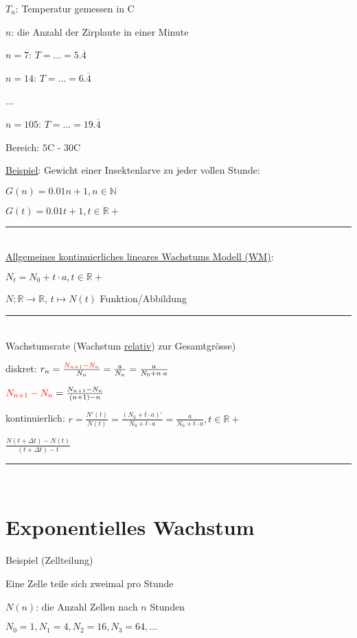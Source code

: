 \documentclass[18pt,a4paper]{scrreprt}
\begin{document}
$T_n$: Temperatur gemessen in \textdegree C

$n$: die Anzahl der Zirplaute in einer Minute

$n = 7$: $T = ... = 5.\overline{4}$ 

$n = 14$: $T = ... = 6.\overline{4}$

...

$n = 105$: $T = ... = 19.\overline{4}$

Bereich: $5$\textdegree C - $30$\textdegree C

\uline{Beispiel}: Gewicht einer Insektenlarve zu jeder vollen Stunde:

$G(n) = 0.01n + 1, n \in \mathbb{N}$

$G(t) = 0.01t + 1, t \in \mathbb{R+}$

\rule{\textwidth}{0.4mm}\\

\uline{Allgemeines kontinuierliches lineares Wachstums Modell (WM)}:

$N_t = N_0 + t \cdot a, t \in \mathbb{R+}$

$N: \mathbb{R} \rightarrow \mathbb{R}$, $t \mapsto N(t)$ Funktion/Abbildung

\rule{\textwidth}{0.4mm}\\

Wachstumsrate (Wachstum \uline{relativ}) zur Gesamtgrösse)

diskret: $r_n = \frac{\textcolor{red}{N_{n+1} - N_n}}{N_n} = \frac{a}{N_n} = \frac{a}{N_0 + n \cdot a}$

$\textcolor{red}{N_{n+1} - N_n} = \frac{N_{n+1} - N_n}{(n+1) - n}$

kontinuierlich: $r = \frac{N'(t)}{N(t)} = \frac{(N_0 + t \cdot a)'}{N_0 + t \cdot a} = \frac{a}{N_0 + t \cdot a}, t \in \mathbb{R+}$

$\frac{N(t + \Delta t) - N(t)}{(t + \Delta t) - t}$

\rule{\textwidth}{0.4mm}\\

\section{Exponentielles Wachstum}

Beispiel (Zellteilung)

Eine Zelle teile sich zweimal pro Stunde

$N(n)$: die Anzahl Zellen nach $n$ Stunden

$N_0 = 1, N_1 = 4, N_2 = 16, N_3 = 64, ...$
\end{document}

